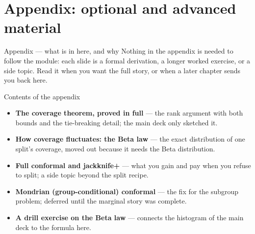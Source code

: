 \documentclass[aspectratio=169,11pt]{beamer}
\begin{document}
\appendix
\AtBeginSection[]{}
\section{Appendix: optional and advanced material}

\begin{frame}{Appendix --- what is in here, and why}
  \small
  Nothing in the appendix is needed to follow the module: each slide is a
  formal derivation, a longer worked exercise, or a side topic. Read it when
  you want the full story, or when a later chapter sends you back here.
  \begin{block}{Contents of the appendix}
    \begin{itemize}
      \item \textbf{The coverage theorem, proved in full} --- the rank argument with
            both bounds and the tie-breaking detail; the main deck only sketched it.
      \item \textbf{How coverage fluctuates: the Beta law} --- the exact distribution
            of one split's coverage, moved out because it needs the Beta distribution.
      \item \textbf{Full conformal and jackknife+} --- what you gain and pay when you
            refuse to split; a side topic beyond the split recipe.
      \item \textbf{Mondrian (group-conditional) conformal} --- the fix for the
            subgroup problem; deferred until the marginal story was complete.
      \item \textbf{A drill exercise on the Beta law} --- connects the histogram of
            the main deck to the formula here.
    \end{itemize}
  \end{block}
\end{frame}
\end{document}

